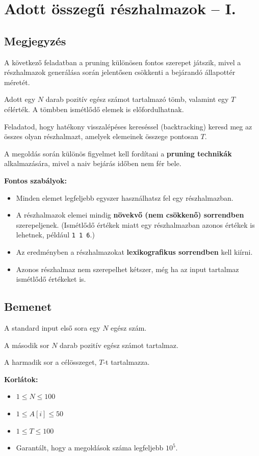 \documentclass[12pt,a4paper]{article}
\begin{document}
\section{Adott összegű részhalmazok -- I.}

\subsection*{Megjegyzés}
A következő feladatban a pruning különösen fontos szerepet játszik, mivel a részhalmazok generálása során jelentősen csökkenti a bejárandó állapottér méretét.

\vspace{1cm}

Adott egy $N$ darab pozitív egész számot tartalmazó tömb, valamint egy $T$ célérték. A tömbben ismétlődő elemek is előfordulhatnak.

Feladatod, hogy hatékony visszalépéses kereséssel (backtracking) keresd meg az összes olyan részhalmazt, amelyek elemeinek összege pontosan $T$.

A megoldás során különös figyelmet kell fordítani a \textbf{pruning technikák} alkalmazására, mivel a naiv bejárás időben nem fér bele.

\textbf{Fontos szabályok:}
\begin{itemize}
    \item Minden elemet legfeljebb egyszer használhatsz fel egy részhalmazban.
    \item A részhalmazok elemei mindig \textbf{növekvő (nem csökkenő) sorrendben} szerepeljenek. (Ismétlődő értékek miatt egy részhalmazban azonos értékek is lehetnek, például \texttt{1 1 6}.)
    \item Az eredményben a részhalmazokat \textbf{lexikografikus sorrendben} kell kiírni.
    \item Azonos részhalmaz nem szerepelhet kétszer, még ha az input tartalmaz ismétlődő értékeket is.
\end{itemize}

\subsection*{Bemenet}

A standard input első sora egy $N$ egész szám.

A második sor $N$ darab pozitív egész számot tartalmaz.

A harmadik sor a célösszeget, $T$-t tartalmazza.

\textbf{Korlátok:}
\begin{itemize}
    \item $1 \le N \le 100$
    \item $1 \le A[i] \le 50$
    \item $1 \le T \le 100$
    \item Garantált, hogy a megoldások száma legfeljebb $10^5$.
\end{itemize}
\end{document}
